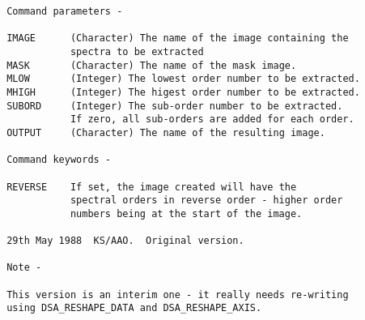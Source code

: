 \begin{description}
\begin{verbatim}
 Command parameters -

 IMAGE      (Character) The name of the image containing the
            spectra to be extracted
 MASK       (Character) The name of the mask image.
 MLOW       (Integer) The lowest order number to be extracted.
 MHIGH      (Integer) The higest order number to be extracted.
 SUBORD     (Integer) The sub-order number to be extracted.
            If zero, all sub-orders are added for each order.
 OUTPUT     (Character) The name of the resulting image.

 Command keywords -

 REVERSE    If set, the image created will have the
            spectral orders in reverse order - higher order
            numbers being at the start of the image.

 29th May 1988  KS/AAO.  Original version.

 Note -

 This version is an interim one - it really needs re-writing
 using DSA_RESHAPE_DATA and DSA_RESHAPE_AXIS.
\end{verbatim}
\end{description}
